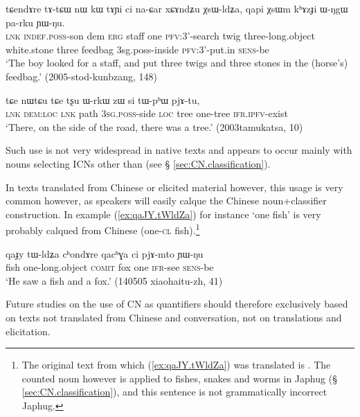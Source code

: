 \begin{exe}
\ex \label{ex:xCAndZu.XsWldZa}
\gll tɕendɤre tɤ-tɕɯ nɯ kɯ tɤɲi ci na-ɕar xɕɤndʑu χsɯ-ldʑa, qapi χsɯm kʰɤzɟi ɯ-ŋgɯ pa-rku ɲɯ-ŋu. \\
\textsc{lnk} \textsc{indef}.\textsc{poss}-son dem \textsc{erg} staff one \textsc{pfv}:3'-search twig three-long.object white.stone three feedbag 3sg.poss-inside \textsc{pfv}:3'-put.in \textsc{sens}-be \\
\glt `The boy looked for a staff, and put three twigs and three stones in the (horse's) feedbag.' (2005-stod-kunbzang, 148)
\end{exe} 

\begin{exe}
\ex \label{ex:si.tWphW.pjAtu}
\gll tɕe nɯtɕu tɕe tʂu ɯ-rkɯ zɯ si tɯ-pʰɯ pjɤ-tu,  \\
\textsc{lnk} \textsc{dem}:\textsc{loc} \textsc{lnk} path \textsc{3sg}.\textsc{poss}-side \textsc{loc} tree one-tree \textsc{ifr}.\textsc{ipfv}-exist \\
\glt `There, on the side of the road, there was a tree.' (2003tamukatsa, 10)
\end{exe} 


Such use is not very widespread in native texts and appears to occur mainly with nouns selecting ICNs other than  (see § \ref{sec:CN.classification}).

In texts translated from Chinese or elicited material however, this usage is very common however, as speakers will easily calque the Chinese noun+classifier construction. In example (\ref{ex:qaJY.tWldZa}) for instance  `one fish' is very probably calqued from Chinese   (one-\textsc{cl} fish).\footnote{The original text from which (\ref{ex:qaJY.tWldZa}) was translated is . The counted noun  however is applied to fishes, snakes and worms in Japhug (§ \ref{sec:CN.classification}), and this sentence is not grammatically incorrect Japhug. } 

\begin{exe}
\ex \label{ex:qaJY.tWldZa}
\gll qaɟy tɯ-ldʑa cʰondɤre qacʰɣa ci pjɤ-mto ɲɯ-ŋu \\
fish one-long.object \textsc{comit} fox one \textsc{ifr}-see \textsc{sens}-be \\
\glt `He saw a fish and a fox.' (140505 xiaohaitu-zh, 41)
\end{exe} 

Future studies on the use of CN as quantifiers should therefore exclusively based on texts not translated from Chinese and conversation, not on translations and elicitation.

